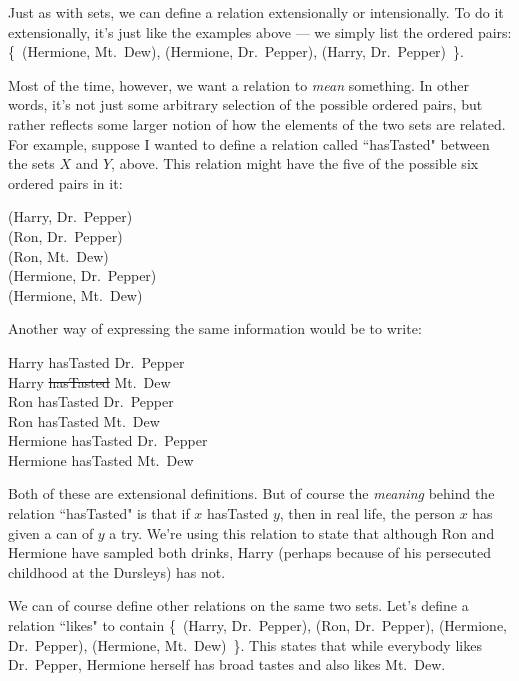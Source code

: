 Just as with sets, we can define a relation extensionally or intensionally.
To do it extensionally, it's just like the examples above --- we simply
list the ordered pairs: \{~(Hermione, Mt.~Dew), (Hermione, Dr.~Pepper),
(Harry, Dr.~Pepper)~\}.

Most of the time, however, we want a relation to \textit{mean} something.
In other words, it's not just some arbitrary selection of the possible
ordered pairs, but rather reflects some larger notion of how the elements
of the two sets are related. For example, suppose I wanted to define a
relation called ``hasTasted" between the sets $X$ and $Y$, above. This
relation might have the five of the possible six ordered pairs in it:

\begin{center}
(Harry, Dr.~Pepper) \\
(Ron, Dr.~Pepper) \\
(Ron, Mt.~Dew) \\
(Hermione, Dr.~Pepper) \\
(Hermione, Mt.~Dew)
\end{center}

Another way of expressing the same information would be to write:

\begin{center}
Harry hasTasted Dr.~Pepper \\
Harry \sout{hasTasted} Mt.~Dew \\
Ron hasTasted Dr.~Pepper \\
Ron hasTasted Mt.~Dew \\
Hermione hasTasted Dr.~Pepper \\
Hermione hasTasted Mt.~Dew \\
\end{center}

Both of these are extensional definitions. But of course the
\textit{meaning} behind the relation ``hasTasted" is that if $x$ hasTasted
$y$, then in real life, the person $x$ has given a can of $y$ a try.  We're
using this relation to state that although Ron and Hermione have sampled
both drinks, Harry (perhaps because of his persecuted childhood at the
Dursleys) has not. 

We can of course define other relations on the same two sets. Let's define
a relation ``likes" to contain \{~(Harry, Dr.~Pepper), (Ron, Dr.~Pepper),
(Hermione, Dr.~Pepper), (Hermione, Mt.~Dew)~\}. This states that while
everybody likes Dr.~Pepper, Hermione herself has broad tastes and also
likes Mt.~Dew.

